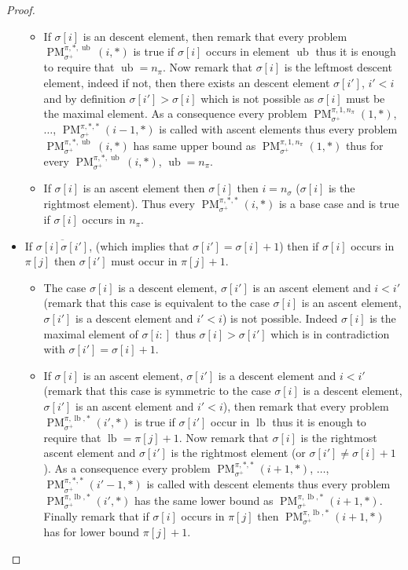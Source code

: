 \documentclass[a4paper]{llncs}
\newcommand{\ptext}{\pi}
\newcommand{\pmotif}{\sigma}
\newcommand{\pbmotif}{\pmotif^+}
\DeclareMathOperator{\PMa}{PM}
\newcommand{\PM}[6]{\PMa_{{#1}}^{{#2},{#3},{#4}}({#5},{#6})}
\DeclareMathOperator{\lb}{lb}
\DeclareMathOperator{\ub}{ub}
\begin{document}
\begin{proof}
\begin{itemize}
\begin{itemize}
		\item If $\sigma[i]$ is an descent element, then remark that 
		every problem 
		$\PM{\pbmotif}{\ptext}{*}{\ub}{i}{*}$ is true if $\sigma[i]$ occurs in element $\ub$ thus it is enough to require that $\ub=n_{\ptext}$.
		Now remark that $\sigma[i]$ is the leftmost descent element, indeed if not, then there exists an descent element $\sigma[i']$, $i'<i$ and by definition $\sigma[i']>\sigma[i]$ which is not possible as $\sigma[i]$ must be the maximal element. As a consequence every problem $\PM{\pbmotif}{\ptext}{1}{n_{\ptext}}{1}{*}$, $\dots$, $\PM{\pbmotif}{\ptext}{*}{*}{i-1}{*}$ is called with ascent elements thus every problem 
		$\PM{\pbmotif}{\ptext}{*}{\ub}{i}{*}$ has same upper bound as $\PM{\pbmotif}{\ptext}{1}{n_{\ptext}}{1}{*}$ thus for every $\PM{\pbmotif}{\ptext}{*}{\ub}{i}{*}$,
		$\ub=n_{\ptext}$.	
		
		
		\item If $\sigma[i]$ is an ascent element then $\sigma[i]$ then $i=n_\pmotif$ ($\sigma[i]$ is the rightmost element). Thus every $\PM{\pbmotif}{\ptext}{*}{*}{i}{*}$ is a base case and is true if $\sigma[i]$ occurs in $n_{\ptext}$.

	\end{itemize}

	\item  If $\overline{\pmotif[i]\pmotif[i']}$,  (which implies that $\pmotif[i']=\pmotif[i]+1$) then if $\pmotif[i]$ occurs in $\ptext[j]$ then $\pmotif[i']$ must occur in $\ptext[j]+1$.
		\begin{itemize}

			\item The case $\pmotif[i]$ is a descent element, $\pmotif[i']$ is an ascent element and $i<i'$ (remark that this case is equivalent to the case $\pmotif[i]$ is an ascent element, $\pmotif[i']$ is a descent element and $i'<i$) is not possible. 
			Indeed $\pmotif[i]$ is the maximal element of $\pmotif[i:]$ thus $\pmotif[i] > \pmotif[i']$ which is in contradiction with 
			$\pmotif[i']=\pmotif[i]+1$. 
			
			\item If $\pmotif[i]$ is an ascent element, $\pmotif[i']$ is a descent element and $i<i'$ (remark that this case is symmetric to the case $\pmotif[i]$ is a descent element, $\pmotif[i']$ is an ascent element and $i'<i$), then
			remark that every problem 
			$\PM{\pbmotif}{\ptext}{\lb}{*}{i'}{*}$ is true if $\sigma[i']$ occur in $\lb$ thus it is enough to require that $\lb=\ptext[j]+1$.
			Now remark that
			$\pmotif[i]$ is the rightmost ascent element and $\pmotif[i']$ is the rightmost element (or $\pmotif[i'] \neq \pmotif[i]+1$). 
			As a consequence every problem $\PM{\pbmotif}{\ptext}{*}{*}{i+1}{*}$, $\dots$, $\PM{\pbmotif}{\ptext}{*}{*}{i'-1}{*}$ is called with descent elements
			thus every problem 
			$\PM{\pbmotif}{\ptext}{\lb}{*}{i'}{*}$ 
			has the same lower bound as $\PM{\pbmotif}{\ptext}{\lb}{*}{i+1}{*}$.
			Finally remark that if $\pmotif[i]$ occurs in $\ptext[j]$ then  $\PM{\pbmotif}{\ptext}{\lb}{*}{i+1}{*}$ has for lower bound $\ptext[j]+1$.
			

\end{itemize}
\end{itemize}
\end{proof}
\end{document}
